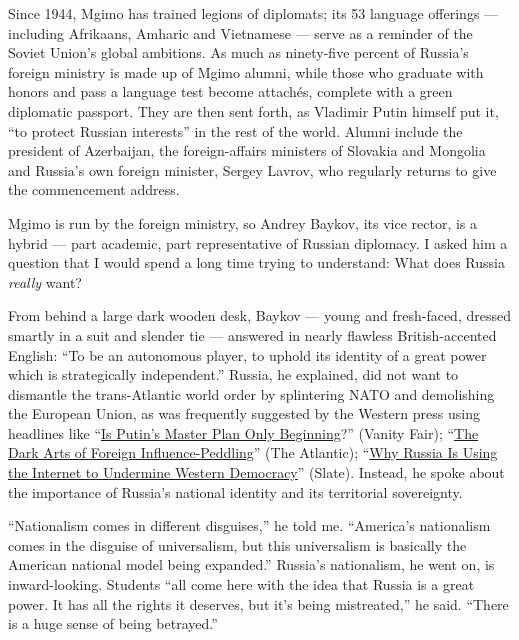 Since 1944, Mgimo has trained legions of diplomats; its 53 language
offerings --- including Afrikaans, Amharic and Vietnamese --- serve as a
reminder of the Soviet Union's global ambitions. As much as ninety-five
percent of Russia's foreign ministry is made up of Mgimo alumni, while
those who graduate with honors and pass a language test become attachés,
complete with a green diplomatic passport. They are then sent forth, as
Vladimir Putin himself put it, ``to protect Russian interests'' in the
rest of the world. Alumni include the president of Azerbaijan, the
foreign-affairs ministers of Slovakia and Mongolia and Russia's own
foreign minister, Sergey Lavrov, who regularly returns to give the
commencement address.

Mgimo is run by the foreign ministry, so Andrey Baykov, its vice rector,
is a hybrid --- part academic, part representative of Russian diplomacy.
I asked him a question that I would spend a long time trying to
understand: What does Russia \emph{really} want?

From behind a large dark wooden desk, Baykov --- young and fresh-faced,
dressed smartly in a suit and slender tie --- answered in nearly
flawless British-accented English: ``To be an autonomous player, to
uphold its identity of a great power which is strategically
independent.'' Russia, he explained, did not want to dismantle the
trans-Atlantic world order by splintering NATO and demolishing the
European Union, as was frequently suggested by the Western press using
headlines like
``\href{https://www.vanityfair.com/news/2016/12/is-vladimir-putin-master-plan-only-beginning}{Is
Putin's Master Plan Only Beginning}?'' (Vanity Fair);
``\href{https://www.theatlantic.com/international/archive/2018/02/trump-manafort-mueller-indictment-putin-russia-ukraine-germany-lobbying/554210/}{The
Dark Arts of Foreign Influence-Peddling}'' (The Atlantic);
``\href{https://slate.com/technology/2016/12/why-russia-is-using-the-internet-to-undermine-western-democracy.html}{Why
Russia Is Using the Internet to Undermine Western Democracy}'' (Slate).
Instead, he spoke about the importance of Russia's national identity and
its territorial sovereignty.

``Nationalism comes in different disguises,'' he told me. ``America's
nationalism comes in the disguise of universalism, but this universalism
is basically the American national model being expanded.'' Russia's
nationalism, he went on, is inward-looking. Students ``all come here
with the idea that Russia is a great power. It has all the rights it
deserves, but it's being mistreated,'' he said. ``There is a huge sense
of being betrayed.''

